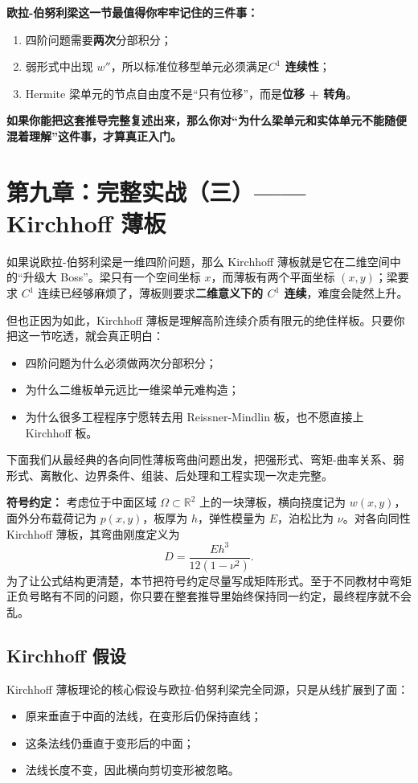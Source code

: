 \documentclass[11pt, a4paper, UTF8]{ctexart}
\begin{document}
\textbf{欧拉-伯努利梁这一节最值得你牢牢记住的三件事：}
\begin{enumerate}
    \item 四阶问题需要\textbf{两次}分部积分；
    \item 弱形式中出现 $w''$，所以标准位移型单元必须满足\textbf{$C^1$ 连续性}；
    \item Hermite 梁单元的节点自由度不是“只有位移”，而是\textbf{位移 + 转角}。
\end{enumerate}

\textbf{如果你能把这套推导完整复述出来，那么你对“为什么梁单元和实体单元不能随便混着理解”这件事，才算真正入门。}

\section{第九章：完整实战（三）—— Kirchhoff 薄板}
如果说欧拉-伯努利梁是一维四阶问题，那么 Kirchhoff 薄板就是它在二维空间中的“升级大 Boss”。梁只有一个空间坐标 $x$，而薄板有两个平面坐标 $(x,y)$；梁要求 $C^1$ 连续已经够麻烦了，薄板则要求\textbf{二维意义下的 $C^1$ 连续}，难度会陡然上升。

但也正因为如此，Kirchhoff 薄板是理解高阶连续介质有限元的绝佳样板。只要你把这一节吃透，就会真正明白：
\begin{itemize}
    \item 四阶问题为什么必须做两次分部积分；
    \item 为什么二维板单元远比一维梁单元难构造；
    \item 为什么很多工程程序宁愿转去用 Reissner-Mindlin 板，也不愿直接上 Kirchhoff 板。
\end{itemize}

下面我们从最经典的各向同性薄板弯曲问题出发，把强形式、弯矩-曲率关系、弱形式、离散化、边界条件、组装、后处理和工程实现一次走完整。

\textbf{符号约定：}
考虑位于中面区域 $\Omega \subset \mathbb{R}^2$ 上的一块薄板，横向挠度记为 $w(x,y)$，面外分布载荷记为 $p(x,y)$，板厚为 $h$，弹性模量为 $E$，泊松比为 $\nu$。对各向同性 Kirchhoff 薄板，其弯曲刚度定义为
\[
D = \frac{Eh^3}{12(1-\nu^2)}.
\]
为了让公式结构更清楚，本节把符号约定尽量写成矩阵形式。至于不同教材中弯矩正负号略有不同的问题，你只要在整套推导里始终保持同一约定，最终程序就不会乱。

\subsection{Kirchhoff 假设}
Kirchhoff 薄板理论的核心假设与欧拉-伯努利梁完全同源，只是从线扩展到了面：
\begin{itemize}
    \item 原来垂直于中面的法线，在变形后仍保持直线；
    \item 这条法线仍垂直于变形后的中面；
    \item 法线长度不变，因此横向剪切变形被忽略。
\end{itemize}
\end{document}
